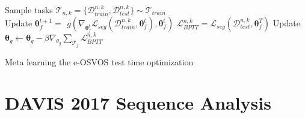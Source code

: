 \documentclass{article}
\begin{document}
    

\begin{algorithm}
    \footnotesize
    {
        Sample tasks $\mathcal{T}_{n,k} = \{\mathcal{D}_{train}^{n,k}, \mathcal{D}_{test}^{n,k} \} \sim \mathcal{T}_{train}$ \\
        {
            {
Update $\boldsymbol \theta_f^{t+1} = \,\ g(\nabla_{\boldsymbol \theta_f^t} \mathcal{L}_{seg}(\mathcal{D}_{train}^{n,k}, \boldsymbol \theta_f^t), \boldsymbol \theta_f^t)$ }
            $\mathcal{L}_{BPTT}^{n,k} = \mathcal{L}_{seg}(\mathcal{D}_{test}^{n,k}, \boldsymbol \theta_f^T)$
}
        Update $\boldsymbol \theta_g \leftarrow \boldsymbol \theta_g - \beta \nabla_{\theta_g} \sum_{\mathcal{T}_j}  \mathcal{L}_{BPTT}^{n,k}$ \\
}

    \caption{Meta learning the e-OSVOS test time optimization}
    \label{alg:meta_training}
\end{algorithm}
 
\section{DAVIS 2017 Sequence Analysis}

    
\end{document}
